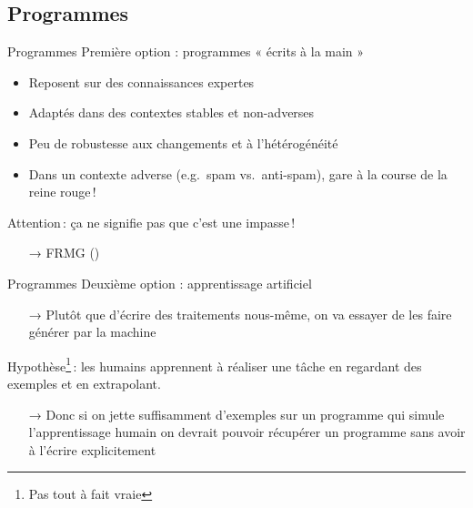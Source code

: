 \documentclass[hyperref={unicode}, xcolor={svgnames}, french]{beamer}
\begin{document}
\subsection{Programmes}
\begin{frame}{Programmes}
    Première option : programmes « écrits à la main »
    \begin{itemize}
        \item Reposent sur des \alert{connaissances expertes}
        \item Adaptés dans des contextes \alert{stables} et \alert{non-adverses}
        \item Peu de robustesse aux changements et à l'\alert{hétérogénéité}
        \item Dans un contexte adverse (e.g.\ spam vs.\ anti-spam), gare à la course de la reine rouge !
    \end{itemize}
    Attention : ça ne signifie pas que c'est une impasse !
    \begin{itemize}
        \item[→] FRMG ()
    \end{itemize}
\end{frame}

\begin{frame}{Programmes}
    Deuxième option : \alert{apprentissage artificiel}

    \begin{itemize}
        \item[→] Plutôt que d'écrire des traitements nous-même, on va essayer de les faire générer par la machine
    \end{itemize}

    Hypothèse\footnote{Pas tout à fait vraie} : les humains apprennent à réaliser une tâche en  regardant des \alert{exemples} et en \alert{extrapolant}.

    \begin{itemize}
        \item[→] Donc si on jette suffisamment d'exemples sur un programme qui simule l'apprentissage humain on devrait pouvoir récupérer un programme sans avoir à l'écrire explicitement
    \end{itemize}
\end{frame}
\end{document}
